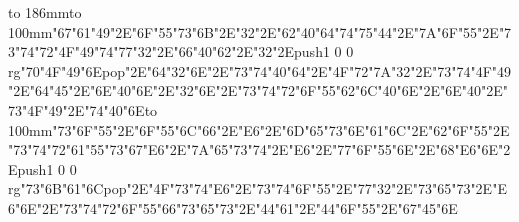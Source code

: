 \hbox to 186mm{\hsize=81mm\vbox to 100mm{\vfill\ipa\char"67\ipa\char"61\ipa\char"49\ipa\char"2E\ipa\char"6F\ipa\char"55\ipa\char"73\ipa\char"6B\ipa\char"2E\ipa\char"32\ipa\char"2E\ipa\char"62\ipa\char"40\ipa\char"64\medskip\ipa\char"74\ipa\char"75\ipa\char"44\ipa\char"2E\ipa\char"7A\ipa\char"6F\ipa\char"55\ipa\char"2E\ipa\char"73\ipa\char"74\ipa\char"72\ipa\char"4F\ipa\char"49\ipa\char"74\medskip\ipa\char"77\ipa\char"32\ipa\char"2E\ipa\char"66\ipa\char"40\ipa\char"62\ipa\char"2E\ipa\char"32\ipa\char"2E\pdfcolorstack\match push{1 0 0 rg}\ipa\char"70\ipa\char"4F\ipa\char"49\ipa\char"6E\pdfcolorstack\match pop{}\ipa\char"2E\ipa\char"64\ipa\char"32\ipa\char"6E\ipa\char"2E\ipa\char"73\ipa\char"74\ipa\char"40\ipa\char"64\ipa\char"2E\ipa\char"4F\ipa\char"72\ipa\char"7A\medskip\ipa\char"32\ipa\char"2E\ipa\char"73\ipa\char"74\ipa\char"4F\ipa\char"49\ipa\char"2E\ipa\char"64\ipa\char"45\ipa\char"2E\ipa\char"6E\ipa\char"40\ipa\char"6E\ipa\char"2E\ipa\char"32\ipa\char"6E\ipa\char"2E\ipa\char"73\ipa\char"74\ipa\char"72\ipa\char"6F\ipa\char"55\ipa\char"62\medskip\ipa\char"6C\ipa\char"40\ipa\char"6E\ipa\char"2E\ipa\char"6E\ipa\char"40\ipa\char"2E\ipa\char"73\ipa\char"4F\ipa\char"49\ipa\char"2E\ipa\char"74\ipa\char"40\ipa\char"6E\vfill}\hfill\vbox to 100mm{\vfill\ipa\char"73\ipa\char"6F\ipa\char"55\ipa\char"2E\ipa\char"6F\ipa\char"55\ipa\char"6C\ipa\char"66\ipa\char"2E\ipa\char"E6\ipa\char"2E\ipa\char"6D\ipa\char"65\ipa\char"73\medskip\ipa\char"6E\ipa\char"61\ipa\char"6C\ipa\char"2E\ipa\char"62\ipa\char"6F\ipa\char"55\ipa\char"2E\ipa\char"73\ipa\char"74\ipa\char"72\ipa\char"61\ipa\char"55\ipa\char"73\medskip\ipa\char"67\ipa\char"E6\ipa\char"2E\ipa\char"7A\ipa\char"65\ipa\char"73\ipa\char"74\ipa\char"2E\ipa\char"E6\ipa\char"2E\ipa\char"77\ipa\char"6F\ipa\char"55\ipa\char"6E\ipa\char"2E\ipa\char"68\ipa\char"E6\ipa\char"6E\ipa\char"2E\pdfcolorstack\match push{1 0 0 rg}\ipa\char"73\ipa\char"6B\ipa\char"61\ipa\char"6C\pdfcolorstack\match pop{}\ipa\char"2E\ipa\char"4F\ipa\char"73\ipa\char"74\medskip\ipa\char"E6\ipa\char"2E\ipa\char"73\ipa\char"74\ipa\char"6F\ipa\char"55\ipa\char"2E\ipa\char"77\ipa\char"32\ipa\char"2E\ipa\char"73\ipa\char"65\ipa\char"73\ipa\char"2E\ipa\char"E6\ipa\char"6E\ipa\char"2E\ipa\char"73\ipa\char"74\ipa\char"72\ipa\char"6F\ipa\char"55\ipa\char"66\medskip\ipa\char"73\ipa\char"65\ipa\char"73\ipa\char"2E\ipa\char"44\ipa\char"61\ipa\char"2E\ipa\char"44\ipa\char"6F\ipa\char"55\ipa\char"2E\ipa\char"67\ipa\char"45\ipa\char"6E\vfill}}\eject
